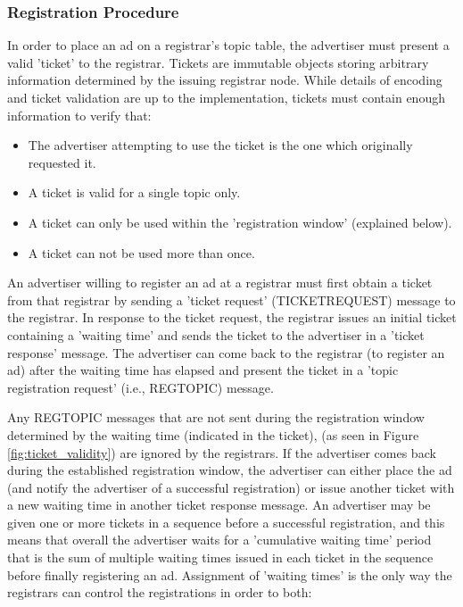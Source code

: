 \subsubsection{Registration Procedure}

In order to place an ad on a registrar's topic table,  the advertiser must present a valid 'ticket' to the registrar. 
Tickets are immutable objects storing arbitrary information determined by the issuing registrar node.  While details of encoding and ticket validation are up to the implementation, tickets must contain enough information to verify that:
\begin{itemize}
    \item The advertiser attempting to use the ticket is the one which originally requested it.
    \item A ticket is valid for a single topic only.
    \item A ticket can only be used within the 'registration window' (explained below).
    \item A ticket can not be used more than once.
\end{itemize}

An advertiser willing to register an ad at a registrar must first obtain a ticket from that registrar by sending a 'ticket request' (TICKETREQUEST) message to the registrar. In response to the ticket request, the registrar issues an initial ticket containing a 'waiting time' and sends the ticket to the advertiser in a 'ticket response' message. The advertiser can come back to the registrar (to register an ad) after the waiting time has elapsed and present the ticket in a 'topic registration request' (i.e., REGTOPIC) message.

Any REGTOPIC messages that are not sent during the registration window determined by the waiting time (indicated in the ticket),   (as seen in Figure \ref{fig:ticket_validity}) are ignored by the registrars.  
If the advertiser comes back during the established registration window,  the advertiser can either place the ad (and notify the advertiser of a successful registration) or issue another ticket with a new waiting time in another ticket response message. 
An advertiser may be given one or more tickets in a sequence before a successful registration,  and this means that overall the advertiser waits for a 'cumulative waiting time' period that is the sum of multiple waiting times issued in each ticket in the sequence before finally registering an ad. 
Assignment of 'waiting times' is the only way the registrars can control the registrations in order to both:

